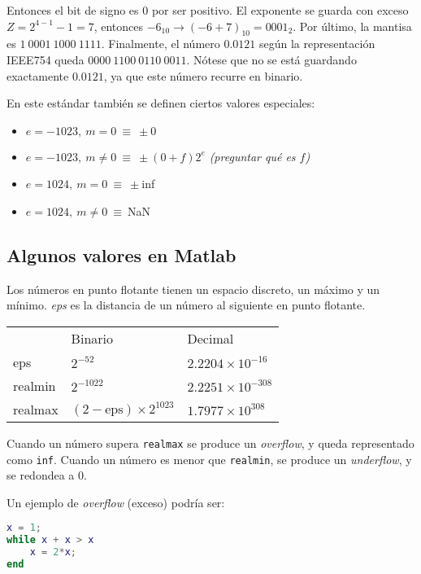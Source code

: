 \documentclass{article}
\begin{document}
Entonces el bit de signo es 0 por ser positivo. El exponente se guarda con 
exceso $Z=2^{4-1}-1=7$, entonces $-6_{10} \rightarrow (-6+7)_{10} = 0001_{2}$.
Por último, la mantisa es $1\ 0001\ 1000\ 1111$. Finalmente, el número $0.0121$
según la representación IEEE754 queda $0000\ 1100\ 0110\ 0011$. Nótese que no se
está guardando exactamente $0.0121$, ya que este número recurre en binario.

En este estándar también se definen ciertos valores especiales:

\begin{itemize}
    \item $e = -1023,\ m=0\ \equiv\ \pm 0$
    \item $e = -1023,\ m\neq 0\ \equiv\ \pm(0+f)2^{e}$ \emph{ (preguntar qué es
    $f$)}
    \item $e = 1024,\ m=0\ \equiv\ \pm$inf
    \item $e = 1024,\ m\neq0\ \equiv\ $NaN
\end{itemize}

\subsection{Algunos valores en Matlab}

Los números en punto flotante tienen un espacio discreto, un máximo y un mínimo.
\textit{eps} es la distancia de un número al siguiente en punto flotante.

\begin{table}[h]
\centering
\begin{tabular}{lll}
        & Binario                        & Decimal \\
eps     & $2^{-52}$                      & $2.2204\times10^{-16}$  \\
realmin & $2^{-1022}$                    & $2.2251\times10^{-308}$ \\
realmax & $(2-\text{eps})\times2^{1023}$ & $1.7977\times10^{308}$
\end{tabular}
\end{table}

Cuando un número supera \verb|realmax| se produce un \textit{overflow}, y queda
representado como \verb|inf|. Cuando un número es menor que \verb|realmin|, se
produce un \textit{underflow}, y se redondea a 0.

Un ejemplo de \textit{overflow} (exceso) podría ser:

\begin{lstlisting}[language=Matlab]
x = 1;
while x + x > x
    x = 2*x;
end
\end{lstlisting}
\end{document}
